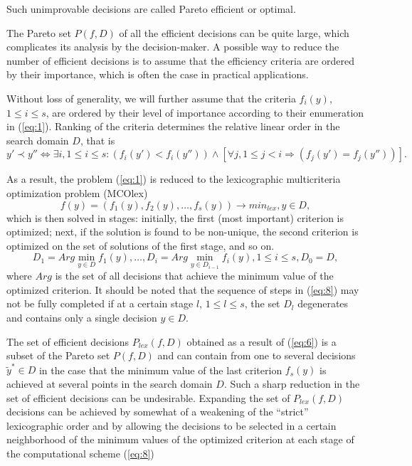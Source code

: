 \documentclass[smallextended]{svjour3}       %
\begin{document}
Such unimprovable decisions are called Pareto efficient or optimal.

The Pareto set $P(f,D)$ of all the efficient decisions can be quite large, which complicates its analysis by the decision-maker. A possible way to reduce the number of efficient decisions is to assume that the efficiency criteria are ordered by their importance, which is often the case in practical applications.

Without loss of generality, we will further assume that the criteria $f_i(y)$, $1 \leq i \leq s$, are ordered by their level of importance according to their enumeration in (\ref{eq:1}). Ranking of the criteria determines the relative linear order in the search domain $D$, that is
\begin{equation}\label{eq:6}
y' \prec y'' \Leftrightarrow \exists i, 1 \leq i \leq s: (f_i(y')<f_i(y'')) \wedge [ \forall j, 1 \leq j <i \Rightarrow (f_j(y')=f_j(y'')) ].
\end{equation}

As a result, the problem (\ref{eq:1}) is reduced to the lexicographic multicriteria optimization problem (MCOlex)
\begin{equation}\label{eq:7}
f(y) = (f_1(y), f_2(y), \dots , f_s(y)) \to min_{lex},  y \in D,
\end{equation}
which is then solved in stages: initially, the first (most important) criterion is optimized; next, if the solution is found to be non-unique, the second criterion is optimized on the set of solutions of the first stage, and so on.
\begin{equation}\label{eq:8}
D_1=Arg \min_{y \in D}{f_1(y)},\dots, D_i=Arg \min_{y \in D_{i-1}}{f_i(y)},1 \leq i \leq s,D_0=D,
\end{equation}
where $Arg$ is the set of all decisions that achieve the minimum value of the optimized criterion. It should be noted that the sequence of steps in (\ref{eq:8}) may not be fully completed if at a certain stage $l$, $1 \leq l \leq s$, the set $D_l$ degenerates and contains only a single decision $y \in D$.

The set of efficient decisions $P_{lex}(f,D)$ obtained as a result of (\ref{eq:6}) is a subset of the Pareto set $P(f,D)$ and can contain from one to several decisions $\widetilde{y}^* \in D$ in the case that the minimum value of the last criterion $f_s(y)$ is achieved at several points in the search domain $D$. Such a sharp reduction in the set of efficient decisions can be undesirable. Expanding the set of $P_{lex}(f,D)$ decisions can be achieved by somewhat of a weakening of the ``strict'' lexicographic order and by allowing the decisions to be selected in a certain neighborhood of the minimum values of the optimized criterion at each stage of the computational scheme (\ref{eq:8})
\end{document}
